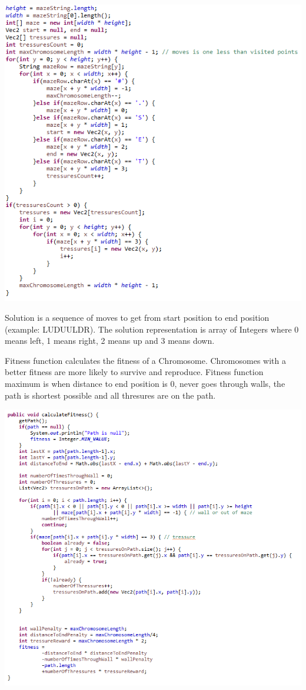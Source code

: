 \documentclass[12pt]{article} %
\begin{document}
\includegraphics{stringToData}

Solution is a sequence of moves to get from start position to end position (example: LUDUULDR). The solution representation is array of Integers where 0 means left, 1 means right, 2 means up and 3 means down.

Fitness function calculates the fitness of a Chromosome. Chromosomes with a better fitness are more likely to survive and reproduce. Fitness function maximum is when distance to end position is 0, never goes through walls, the path is shortest possible and all thresures are on the path.

\includegraphics[scale=1]{fitnessFunction}
\end{document}
